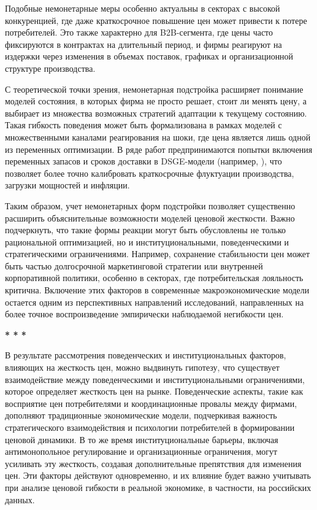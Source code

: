 Подобные немонетарные меры особенно актуальны в секторах с высокой конкуренцией, где даже краткосрочное повышение цен может привести к потере потребителей. Это также характерно для B2B-сегмента, где цены часто фиксируются в контрактах на длительный период, и фирмы реагируют на издержки через изменения в объемах поставок, графиках и организационной структуре производства.

С теоретической точки зрения, немонетарная подстройка расширяет понимание моделей состояния, в которых фирма не просто решает, стоит ли менять цену, а выбирает из множества возможных стратегий адаптации к текущему состоянию. Такая гибкость поведения может быть формализована в рамках моделей с множественными каналами реагирования на шоки, где цена является лишь одной из переменных оптимизации. В ряде работ предпринимаются попытки включения переменных запасов и сроков доставки в DSGE-модели (например, \cite{KhanThomas2007}), что позволяет более точно калибровать краткосрочные флуктуации производства, загрузки мощностей и инфляции.

Таким образом, учет немонетарных форм подстройки позволяет существенно расширить объяснительные возможности моделей ценовой жесткости. Важно подчеркнуть, что такие формы реакции могут быть обусловлены не только рациональной оптимизацией, но и институциональными, поведенческими и стратегическими ограничениями. Например, сохранение стабильности цен может быть частью долгосрочной маркетинговой стратегии или внутренней корпоративной политики, особенно в секторах, где потребительская лояльность критична. Включение этих факторов в современные макроэкономические модели остается одним из перспективных направлений исследований, направленных на более точное воспроизведение эмпирически наблюдаемой негибкости цен.

\begin{center}
	\textbf{*          *          *}
\end{center}

В результате рассмотрения поведенческих и институциональных факторов, влияющих на жесткость цен, можно выдвинуть гипотезу, что существует взаимодействие между поведенческими и институциональными ограничениями, которое определяет жесткость цен на рынке. Поведенческие аспекты, такие как восприятие цен потребителями и координационные провалы между фирмами, дополняют традиционные экономические модели, подчеркивая важность стратегического взаимодействия и психологии потребителей в формировании ценовой динамики. В то же время институциональные барьеры, включая антимонопольное регулирование и организационные ограничения, могут усиливать эту жесткость, создавая дополнительные препятствия для изменения цен. Эти факторы действуют одновременно, и их влияние будет важно учитывать при анализе ценовой гибкости в реальной экономике, в частности, на российских данных.


